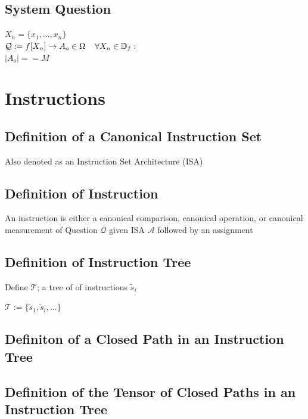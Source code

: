 \documentclass[11pt]{article}
\begin{document}
\subsection{System Question}
\begin{center}
\vspace{2mm}
$
X_n = \{x_1,...,x_n\}
$
\\ \vspace{4mm}
$
\mathcal{Q} := f\lbrack X_n \rbrack \rightarrow A_o \in \Omega \hspace{4mm} \forall X_n \in \mathbb{D}_{f}:
$
\\ \vspace{2mm}
$
|A_o| == M 
$
\end{center}



\section{Instructions}

\subsection{Definition of a Canonical Instruction Set}
Also denoted as an Instruction Set Architecture (ISA)

\subsection{Definition of Instruction}
An instruction is either a canonical comparison, canonical operation, or canonical measurement  of Question $\mathcal{Q}$ given ISA $\mathcal{A}$ followed by an assignment


\subsection{Definition of Instruction Tree}
Define $\mathcal{T}$; a tree of of instructions $\tilde{s}_i$
\vspace{1mm}
\begin{center}
$
\mathcal{T} := \{ \tilde{s}_1,\tilde{s}_i,...\}
$
\end{center}

\subsection{Definiton of a Closed Path in an Instruction Tree}

\subsection{Definition of the Tensor of Closed Paths in an Instruction Tree}
\end{document}
